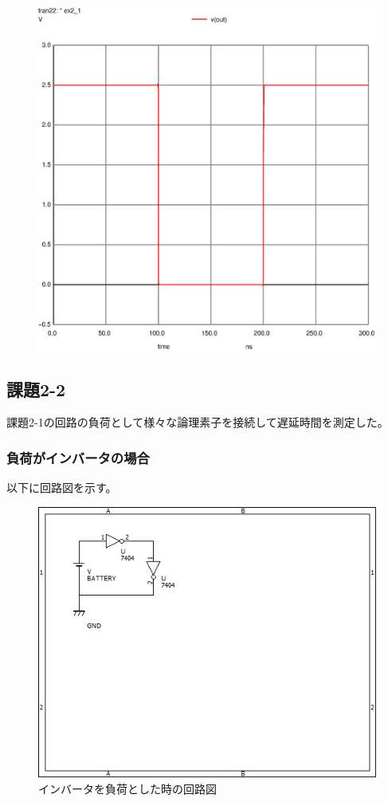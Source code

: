 \documentclass{jsarticle}
\begin{document}
\begin{figure}[H]
    \hspace{50pt}
    \includegraphics[scale=0.8]{ex2_1.ps}
    \vspace{30pt}
\end{figure}

\subsection{課題2-2}
課題2-1の回路の負荷として様々な論理素子を接続して遅延時間を測定した。

\subsubsection{負荷がインバータの場合}
以下に回路図を示す。
\begin{figure}[H]
    \centering
    \includegraphics[bb=0 0 500 400]{ex2_2_inv.png}
    \caption{インバータを負荷とした時の回路図}
\end{figure}
\end{document}
